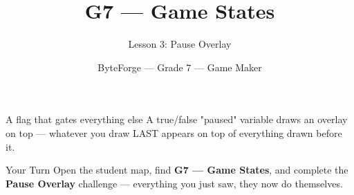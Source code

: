 \documentclass[aspectratio=169]{beamer}
\title{G7 — Game States}
\subtitle{Lesson 3: Pause Overlay}
\author{ByteForge --- Grade 7 --- Game Maker}
\date{}
\begin{document}
\begin{frame}
    \titlepage
\end{frame}

\begin{frame}{A flag that gates everything else}
    \Large
    A true/false "paused" variable draws an overlay on top — whatever you draw LAST appears on top of everything drawn before it.
\end{frame}

\begin{frame}{Your Turn}
    \Large
    Open the student map, find \textbf{G7 — Game States}, and complete
    the \textbf{Pause Overlay} challenge --- everything you just saw, they now do themselves.
\end{frame}
\end{document}
